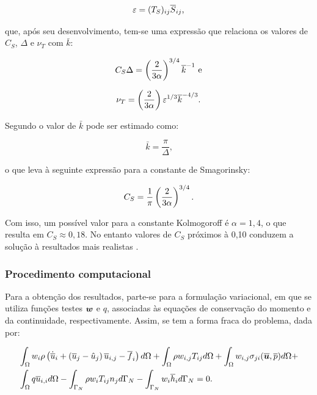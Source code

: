 \begin{equation}
    \varepsilon=({T}_S)_{ij}\overline{S}_{ij}\text{,}
\end{equation}

\noindent que, após seu desenvolvimento, tem-se uma expressão que relaciona os valores de $C_S$, $\Delta$ e $\nu_T$ com $\bar{k}$:

\begin{equation}
    C_S\Delta=\left({\frac{2}{3\alpha}}\right)^{3/4}\overline{k}^{-1}\text{ e}
\end{equation}

\begin{equation}
    \nu_T=\left({\frac{2}{3\alpha}}\right)\varepsilon^{1/3}\overline{k}^{-4/3}\text{.}
\end{equation}

Segundo  o valor de $\bar{k}$ pode ser estimado como:

\begin{equation}
    \bar{k}=\frac{\pi}{\Delta}\text{,}
\end{equation}

\noindent o que leva à seguinte expressão para a constante de Smagorinsky:

\begin{equation}
    C_S=\frac{1}{\pi}\left({\frac{2}{3\alpha}}\right)^{3/4}\text{.}
\end{equation}

Com isso, um possível valor para a constante Kolmogoroff é $\alpha=1,4$, o que resulta em $C_S\approx0,18$. No entanto valores de $C_S$ próximos à 0,10 conduzem a solução à resultados mais realistas \cite{hughes2000large,bailly2015turbulence,katopodes2019free}.

\subsubsection{Procedimento computacional} \label{LES-PC}

Para a obtenção dos resultados, parte-se para a formulação variacional, em que se utiliza funções testes $\boldsymbol{w}$ e $q$, associadas às equações de conservação do momento e da continuidade, respectivamente. Assim, se tem a forma fraca do problema, dada por:

\begin{equation}
    \begin{split}
        &\int_{\Omega}{w_i\rho\left({\dot{\overline{u}}_i+\left({\overline{u}_{j}-\hat{u}_{j}}\right)\overline{u}_{i,j}-\overline{f}_i}\right) d\Omega}+\int_{\Omega}{\rho w_{i,j}T_{ij} d\Omega}+\int_{\Omega}{w_{i,j}\sigma_{ji}(\boldsymbol{\overline{u}},\overline{p}) d\Omega}+\\
        &\int_{\Omega}{q\overline{u}_{i,i} d\Omega}-\int_{\Gamma_N}{\rho w_iT_{ij}n_j d\Gamma_N}-\int_{\Gamma_N}{w_i\overline{h}_i d\Gamma_N}=0\text{.}
    \end{split}
\end{equation}

